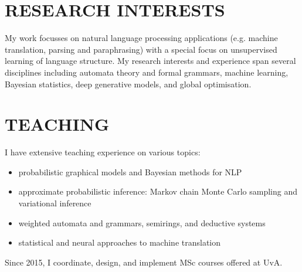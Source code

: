 \section*{RESEARCH INTERESTS}

My work focusses on natural language processing applications (e.g. machine translation, parsing and paraphrasing) with a special focus on unsupervised learning of language structure. 
My research interests and experience span several disciplines including automata theory and formal grammars, machine learning,  Bayesian statistics, deep generative models, and global optimisation.

\section*{TEACHING}

I have extensive teaching experience on various topics:
\begin{itemize}
	\item probabilistic graphical models and Bayesian methods for NLP
	\item approximate probabilistic inference: Markov chain Monte Carlo sampling and variational inference
	\item weighted automata and grammars, semirings, and deductive systems
	\item statistical and neural approaches to machine translation
\end{itemize}

Since 2015, I coordinate, design, and implement MSc courses offered at UvA.

~


